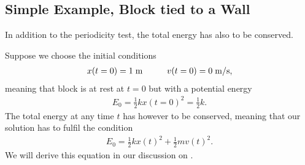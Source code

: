 \documentclass[letterpaper,10pt,english]{sphinxmanual}
\begin{document}
\subsection{Simple Example, Block tied to a Wall}
\label{\detokenize{chapter2:id2}}
In addition to the periodicity test, the total energy has also to be conserved.

Suppose we choose the initial conditions
\begin{equation*}
\begin{split}
x(t=0)=1\hspace{0.1cm} \mathrm{m}\hspace{1cm} v(t=0)=0\hspace{0.1cm}\mathrm{m/s},
\end{split}
\end{equation*}
meaning that block is at rest at \(t=0\) but with a potential energy
\begin{equation*}
\begin{split}
E_0=\frac{1}{2}kx(t=0)^2=\frac{1}{2}k.
\end{split}
\end{equation*}
The total energy at any time \(t\) has however to be conserved, meaning that our solution has to fulfil the condition
\begin{equation*}
\begin{split}
E_0=\frac{1}{2}kx(t)^2+\frac{1}{2}mv(t)^2.
\end{split}
\end{equation*}
We will derive this equation in our discussion on .
\end{document}

